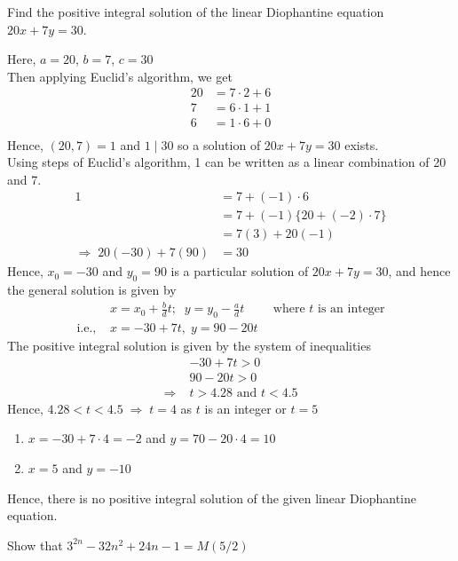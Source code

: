 \documentclass[12pt]{book}
\begin{document}
\begin{qn}[T-3]
    Find the positive integral solution of the linear Diophantine equation $ 20x+7y=30 $.
\end{qn}
\begin{soln}
    Here, $ a=20 $, $ b=7 $, $ c=30 $\\
    Then applying Euclid's algorithm, we get
    \begin{align*}
        20&=7\cdot 2+6\\
        7&=6\cdot 1+1\\
        6&=1\cdot 6+0\\
    \end{align*}
    Hence, $ (20,7)=1 $ and $ 1\mid 30 $ so a solution of $ 20x+7y=30 $ exists.\\
    Using steps of Euclid's algorithm, 1 can be written as a linear combination of 20 and 7.
    \begin{align*}
        1&=7+(-1)\cdot 6\\
        &=7+(-1)\{20+(-2)\cdot 7\}\\
        &=7(3)+20(-1)\\
        \Rightarrow\;20(-30)+7(90)&=30
    \end{align*}
    Hence, $ x_0=-30 $ and $ y_0=90 $ is a particular solution of $ 20x+7y=30 $, and hence the general solution is given by
    \begin{align*}
        & x=x_0+\frac{b}{d}t;\;\;y=y_0-\frac{a}{d}t\qquad\text{ where } t \text{ is an integer}\\
        \text{i.e., }& x=-30+7t,\;y=90-20t
    \end{align*}
    The positive integral solution is given by the system of inequalities
    \begin{align*}
        &-30+7t>0\\
        &90-20t>0\\
        \Rightarrow\;&t>4.28\text{ and } t<4.5
    \end{align*}
    Hence, $ 4.28<t<4.5 \;\Rightarrow\;t=4 $ as $ t $ is an integer or $ t=5 $
    \begin{enumerate}[label=(\roman*)]
        \item $ x=-30+7\cdot 4=-2 $ and $ y=70-20\cdot 4=10 $
        \item $ x=5 $ and $ y=-10 $
    \end{enumerate}
    Hence, there is no positive integral solution of the given linear Diophantine equation.
\end{soln}
\begin{qn}
    Show that $ 3^{2n}-32n^2+24n-1=M(5/2) $
\end{qn}
\end{document}
